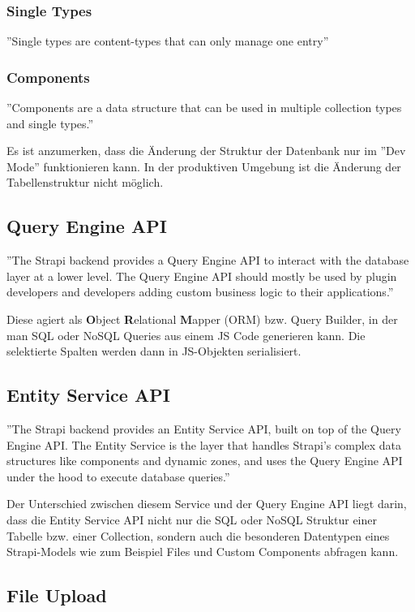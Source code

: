 \subsubsection{Single Types}
\label{single-types}
''Single types are content-types that can only manage one entry''
\cite{collection-types}

\subsubsection*{Components}
''Components are a data structure that can be used in multiple collection types and single types.''
\cite{collection-types}


Es ist anzumerken, dass die Änderung der Struktur der Datenbank nur im ''Dev Mode'' funktionieren kann. In der produktiven Umgebung ist die Änderung der Tabellenstruktur nicht möglich.


\subsection{Query Engine API}
''The Strapi backend provides a Query Engine API to interact with the database layer at a lower level.
The Query Engine API should mostly be used by plugin developers and developers adding custom business logic
to their applications.''
\cite{query-engine-api}

Diese agiert als \textbf{O}bject \textbf{R}elational \textbf{M}apper (ORM) bzw. Query Builder,
in der man SQL oder NoSQL Queries aus einem JS Code generieren kann. Die selektierte Spalten werden dann in JS-Objekten
serialisiert.

\subsection{Entity Service API}
''The Strapi backend provides an Entity Service API, built on top of the Query Engine API.
The Entity Service is the layer that handles Strapi's complex data
structures like components and dynamic zones, and uses the Query Engine API
under the hood to execute database queries.''

Der Unterschied zwischen diesem Service und der Query Engine API liegt darin,
dass die Entity Service API nicht nur die SQL oder NoSQL Struktur einer
Tabelle bzw. einer Collection, sondern auch die besonderen Datentypen eines Strapi-Models wie zum Beispiel Files und Custom Components abfragen kann.
\cite{service-engine-api}
\subsection{File Upload}

